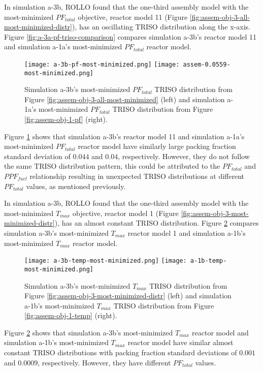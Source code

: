 In simulation a-3b, \gls{ROLLO} found that the one-third assembly model with the 
most-minimized $PF_{total}$ objective, reactor model 11 (Figure 
\ref{fig:assem-obj-3-all-most-minimized-distr}), has an oscillating TRISO distribution 
along the x-axis.
Figure \ref{fig:a-3a-pf-triso-comparison} compares simulation a-3b's reactor model 11 and 
simulation a-1a's most-minimized $PF_{total}$ reactor model. 
\begin{figure}[htbp!]
    \centering
    \texttt{[image: a-3b-pf-most-minimized.png]} 
    \texttt{[image: assem-0.0559-most-minimized.png]} 
    \caption{Simulation a-3b's most-minimized $PF_{total}$ TRISO distribution 
    from Figure \ref{fig:assem-obj-3-all-most-minimized} (left) and simulation a-1a's 
    most-minimized $PF_{total}$ TRISO distribution from Figure 
    \ref{fig:assem-obj-1-pf} (right).}
    \label{fig:a-3b-pf-triso-comparison}
\end{figure}
Figure \ref{fig:a-3b-pf-triso-comparison} shows that simulation a-3b's reactor model 11 
and simulation a-1a's most-minimized $PF_{total}$ reactor model have similarly large 
packing fraction standard deviation of $0.044$ and $0.04$, respectively. 
However, they do not follow the same TRISO distribution pattern, this could be 
attributed to the $PF_{total}$ and $PPF_{fuel}$ relationship resulting in unexpected 
TRISO distributions at different $PF_{total}$ values, as mentioned previously. 

In simulation a-3b, \gls{ROLLO} found that the one-third assembly model with the 
most-minimized $T_{max}$ objective, reactor model 1 (Figure 
\ref{fig:assem-obj-3-most-minimized-distr}), has an almost constant TRISO distribution.
Figure \ref{fig:a-3b-temp-triso-comparison} compares simulation a-3b's most-minimized 
$T_{max}$ reactor model 1 and simulation a-1b's most-minimized $T_{max}$ reactor model. 
\begin{figure}[htbp!]
    \centering
    \texttt{[image: a-3b-temp-most-minimized.png]} 
    \texttt{[image: a-1b-temp-most-minimized.png]} 
    \caption{Simulation a-3b's most-minimized $T_{max}$ TRISO distribution 
    from Figure \ref{fig:assem-obj-3-most-minimized-distr} (left) and simulation a-1b's 
    most-minimized $T_{max}$ TRISO distribution from Figure 
    \ref{fig:assem-obj-1-temp} (right).}
    \label{fig:a-3b-temp-triso-comparison}
\end{figure}
Figure \ref{fig:a-3b-temp-triso-comparison} shows that simulation a-3b's most-minimized 
$T_{max}$ reactor model and simulation a-1b's most-minimized $T_{max}$ reactor model 
have similar almost constant TRISO distributions with packing fraction standard 
deviations of $0.001$ and $0.0009$, respectively.
However, they have different $PF_{total}$ values.

